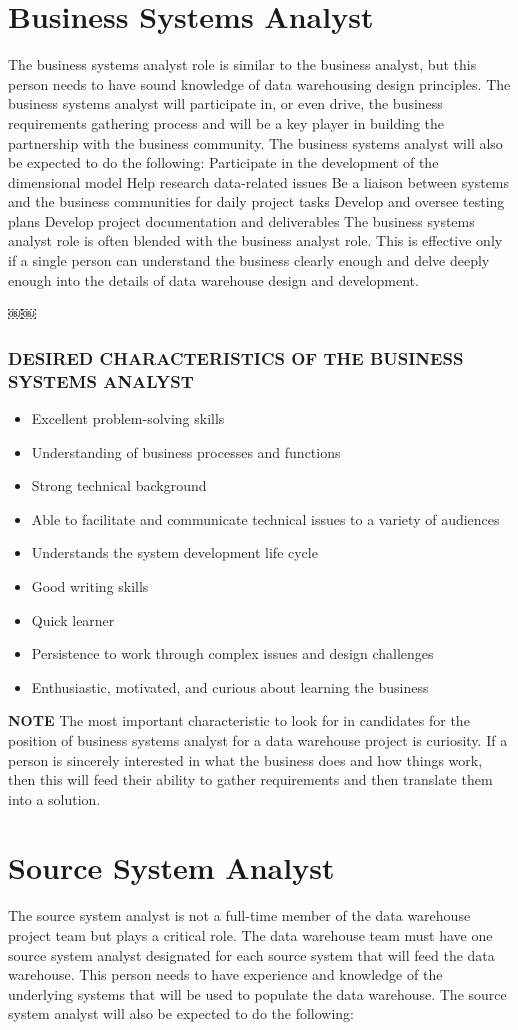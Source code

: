\documentclass{vldb}
\newcommand{\bi}{\begin{itemize}}
\newcommand{\ei}{\end{itemize}}
\newcommand{\ii}{\item}
\begin{document}
\section{Business Systems Analyst}
The business systems analyst role is similar to the business analyst, but this person needs to have sound knowledge of data warehousing design principles. The business systems analyst will participate in, or even drive, the business requirements gathering process and will be a key player in building the partnership with the business community. The business systems analyst will also be expected to do the following:
Participate in the development of the dimensional model Help research data-related issues
Be a liaison between systems and the business communities for daily project tasks
Develop and oversee testing plans
Develop project documentation and deliverables
The business systems analyst role is often blended with the business analyst role. This is effective only if a single person can understand the business clearly enough and delve deeply enough into the details of data warehouse design and development.

￼￼\subsubsection*{DESIRED CHARACTERISTICS OF THE BUSINESS SYSTEMS ANALYST}
\bi
\ii Excellent problem-solving skills
\ii Understanding of business processes and functions
\ii Strong technical background
\ii Able to facilitate and communicate technical issues to a variety of audiences
\ii Understands the system development life cycle
\ii Good writing skills
\ii Quick learner
\ii Persistence to work through complex issues and design challenges
\ii Enthusiastic, motivated, and curious about learning the business
\ei

\noindent
\textbf{NOTE} The most important characteristic to look for in candidates for the position of business systems analyst for a data warehouse project is curiosity. If a person is sincerely interested in what the business does and how things work, then this will feed their ability to gather requirements and then translate them into a solution.

\section{Source System Analyst}
The source system analyst is not a full-time member of the data warehouse project team but plays a critical role. The data warehouse team must have one source system analyst designated for each source system that will feed the data warehouse. This person needs to have experience and knowledge of the underlying systems that will be used to populate the data warehouse. The source system analyst will also be expected to do the following:
\end{document}
